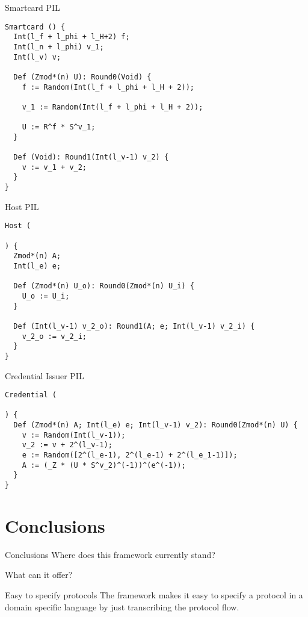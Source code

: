\documentclass{beamer}
\begin{document}
\begin{frame}[fragile]{Smartcard PIL}
\begin{lstlisting}[language=PIL]
Smartcard () {
  Int(l_f + l_phi + l_H+2) f;
  Int(l_n + l_phi) v_1;
  Int(l_v) v;

  Def (Zmod*(n) U): Round0(Void) {
    f := Random(Int(l_f + l_phi + l_H + 2));
  
    v_1 := Random(Int(l_f + l_phi + l_H + 2));

    U := R^f * S^v_1;
  }

  Def (Void): Round1(Int(l_v-1) v_2) {
    v := v_1 + v_2;
  }
}
\end{lstlisting}
\end{frame}

\begin{frame}[fragile]{Host PIL}
\begin{lstlisting}[language=PIL]
Host (

) {
  Zmod*(n) A;
  Int(l_e) e;
  
  Def (Zmod*(n) U_o): Round0(Zmod*(n) U_i) {
    U_o := U_i;
  }

  Def (Int(l_v-1) v_2_o): Round1(A; e; Int(l_v-1) v_2_i) {
    v_2_o := v_2_i;
  }
}
\end{lstlisting}
\end{frame}

\begin{frame}[fragile]{Credential Issuer PIL}
\begin{lstlisting}[language=PIL]
Credential (

) {
  Def (Zmod*(n) A; Int(l_e) e; Int(l_v-1) v_2): Round0(Zmod*(n) U) {
    v := Random(Int(l_v-1));
    v_2 := v + 2^(l_v-1);
    e := Random([2^(l_e-1), 2^(l_e-1) + 2^(l_e_1-1)]);
    A := (_Z * (U * S^v_2)^(-1))^(e^(-1));
  }
}
\end{lstlisting}
\end{frame}

\section{Conclusions}

\begin{frame}{Conclusions}
  Where does this framework currently stand?

  What can it offer?
\end{frame}

\begin{frame}{Easy to specify protocols}
  The framework makes it easy to specify a protocol in a domain
  specific language by just transcribing the protocol flow.
\end{frame}
\end{document}
